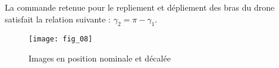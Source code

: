 La commande retenue pour le repliement et dépliement des bras du drone satisfait la relation
suivante : $\gamma_2 = \pi - \gamma_1$.


\ifprof
\begin{corrige}
\end{corrige}
\else
\fi


\begin{obj}

\end{obj}




\begin{figure}[H]
\centering
\texttt{[image: fig\_08]}
\caption{\label{fig:08}  Images en position nominale et décalée}
\end{figure}


\question{\label{q:19}}
\ifprof
\begin{corrige}
\end{corrige}
\else
\fi


